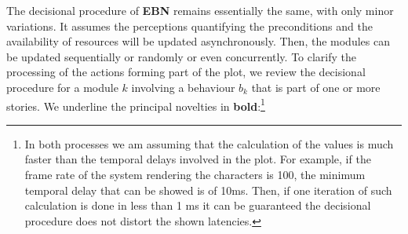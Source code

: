 \documentclass[
		twoside,openright,titlepage,numbers=noenddot,manychapters,
		headinclude,%
                footinclude=false,cleardoublepage=empty,
                BCOR=5mm,
		fontsize=11pt, %
                 enabledeprecatedfontcommands]{scrreprt}
\begin{document}
The decisional procedure of \textbf{EBN}  remains essentially the same, with only minor variations. It assumes the perceptions quantifying the preconditions and the availability of resources will be updated asynchronously. Then, the modules can be updated sequentially or randomly or even concurrently. To clarify the processing of the actions forming part of the plot, we review the decisional procedure for a module $k$ involving a behaviour $b_k$ that is part of one or more stories. We underline the principal novelties in \textbf{bold}:\footnote{ In both processes we am assuming that the calculation of the values is much faster than the temporal delays involved in the plot. For example, if the frame rate of the system rendering the characters is 100, the minimum temporal delay that can be showed is of 10ms. Then, if one iteration of such calculation is done in less than 1 ms it can be guaranteed the decisional procedure does not distort the shown latencies. }
\end{document}
